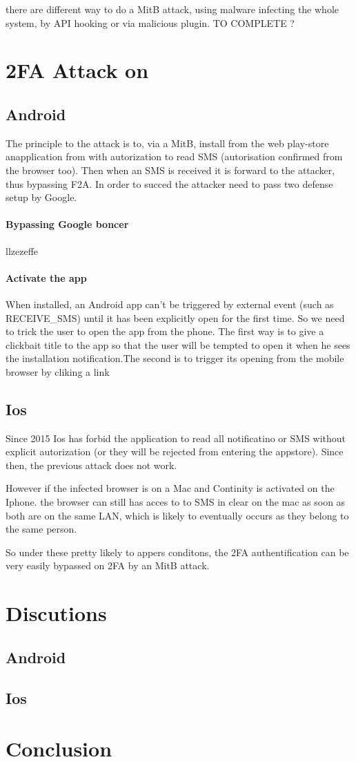 \documentclass[11pt, a4paper,twocolumn]{article}
\begin{document}
there are different way to do a MitB attack, using malware infecting the whole system, by API hooking or via malicious plugin. TO COMPLETE ?
\section{2FA Attack on }
\subsection{Android}
The principle to the attack is to, via a MitB, install from the web play-store anapplication from with autorization to read SMS (autorisation confirmed from the browser 
too). Then when an SMS is received it is forward to the attacker, thus bypassing 
F2A. In order to succed the attacker need to pass two defense setup by Google.

\paragraph{Bypassing Google boncer} llzezeffe

\paragraph{Activate the app} When installed, an Android app can't be triggered by external event (such as RECEIVE\_SMS) until it has been explicitly open for the first time. So we need to trick the user to open the app from the phone. The 
first way is to give a clickbait title to the app so that the user will be tempted to open it when he sees the installation notification.The second is to trigger its opening from the mobile browser by cliking a link

\subsection{Ios}
Since 2015 Ios has forbid the application to read all 
notificatino or SMS without explicit autorization (or they will be rejected from entering the appstore). 
Since then, the previous attack does not work. 

However if the infected browser is on a Mac and Continity 
is activated on the Iphone. the browser can still has acces to to SMS in clear 
on the mac as soon as both are on the same LAN, which is likely to eventually occurs
as they belong to the same person. 

So under these pretty likely to appers conditons, the 2FA authentification can 
be very easily bypassed on 2FA by an MitB attack.


\section{Discutions} 
\subsection{Android}
\subsection{Ios}
\section{Conclusion}

% 
%
\end{document}
